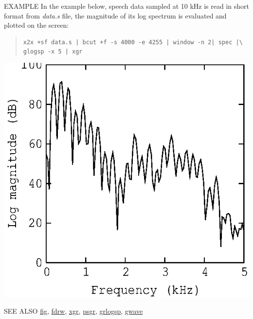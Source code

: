 \begin{qsection}{EXAMPLE}
In the example below, speech data sampled at 10 kHz is read
in short format from {\em data.s} file,
the magnitude of its log spectrum is evaluated and plotted on the screen:
\begin{quote}
 \verb!x2x +sf data.s | bcut +f -s 4000 -e 4255 | window -n 2| spec |\! \\
 \verb!glogsp -x 5 | xgr!
\end{quote}
\begin{center}
 \leavevmode
 \includegraphics{fig/glogsp-sample.eps}
\end{center}
\end{qsection}

\begin{qsection}{SEE ALSO}
\hyperlink{fig}{fig},
\hyperlink{fdrw}{fdrw},
\hyperlink{xgr}{xgr},
\hyperlink{psgr}{psgr},
\hyperlink{grlogsp}{grlogsp},
\hyperlink{gwave}{gwave}
\end{qsection}

